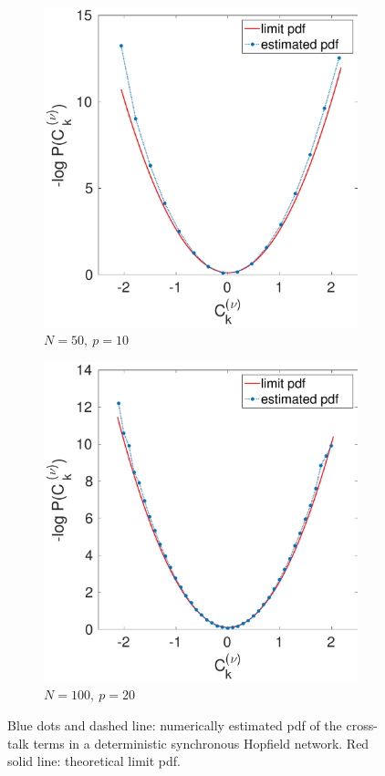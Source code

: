 \documentclass[12pt,A4,titlepage]{article}
\begin{document}
\begin{figure}[H]
\begin{subfigure}[b]{0.32\textwidth}
        \includegraphics[width=\textwidth]{figures/fig_1a_2.pdf}
        \caption{$N = 50, \ p = 10$}
        \label{1a2}
    \end{subfigure}
    \hfill
    \begin{subfigure}[b]{0.32\textwidth}
        \includegraphics[width=\textwidth]{figures/fig_1a_3.pdf}
        \caption{$N = 100, \ p = 20$}
        \label{1a3}
    \end{subfigure}
    \caption{Blue dots and dashed line: numerically estimated pdf of the cross-talk terms in a deterministic synchronous Hopfield network. Red solid line: theoretical limit pdf.}
    \label{1a}
\end{figure}
\end{document}
